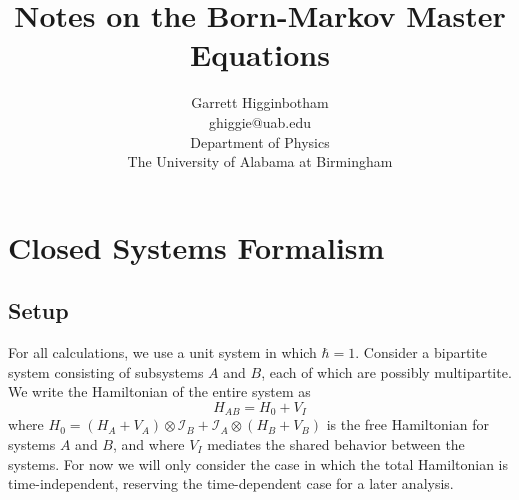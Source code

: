\documentclass{article}
\newcommand{\ten}{\otimes}
\newcommand{\I}{\mathcal{I}}
\begin{document}



\title{Notes on the Born-Markov Master Equations}
\author{Garrett Higginbotham\\ghiggie@uab.edu\\Department of Physics\\The University of Alabama at Birmingham}

\maketitle
\tableofcontents

\section{Closed Systems Formalism}

\subsection{Setup}

For all calculations, we use a unit system in which $\hbar = 1$. Consider a bipartite system consisting of subsystems $A$ and $B$, each of which are possibly multipartite. We write the Hamiltonian of the entire system as
\begin{equation}\label{ham}
H_{AB} = H_0 + V_I
\end{equation}
where $H_0 =  (H_A+V_A)\ten\I_B + \I_A\ten (H_B+V_B)$ is the free Hamiltonian for systems $A$ and $B$, and where $V_I$ mediates the shared behavior between the systems. For now we will only consider the case in which the total Hamiltonian is time-independent, reserving the time-dependent case for a later analysis.
\end{document}
